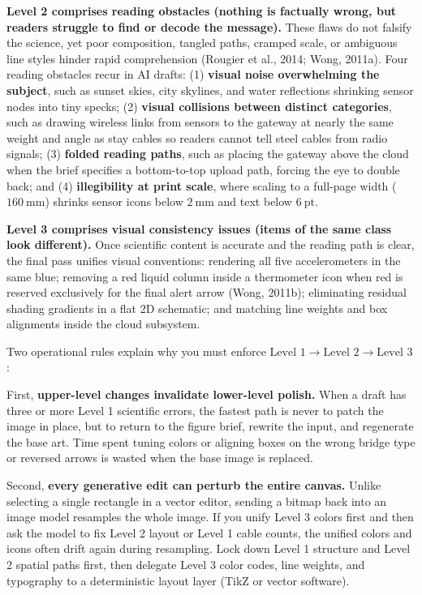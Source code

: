 \textbf{Level 2 comprises reading obstacles (nothing is factually wrong, but readers struggle to find or decode the message).} These flaws do not falsify the science, yet poor composition, tangled paths, cramped scale, or ambiguous line styles hinder rapid comprehension (Rougier et al., 2014; Wong, 2011a). Four reading obstacles recur in AI drafts: (1) \textbf{visual noise overwhelming the subject}, such as sunset skies, city skylines, and water reflections shrinking sensor nodes into tiny specks; (2) \textbf{visual collisions between distinct categories}, such as drawing wireless links from sensors to the gateway at nearly the same weight and angle as stay cables so readers cannot tell steel cables from radio signals; (3) \textbf{folded reading paths}, such as placing the gateway above the cloud when the brief specifies a bottom-to-top upload path, forcing the eye to double back; and (4) \textbf{illegibility at print scale}, where scaling to a full-page width ($160\ \text{mm}$) shrinks sensor icons below $2\ \text{mm}$ and text below $6\ \text{pt}$.

\textbf{Level 3 comprises visual consistency issues (items of the same class look different).} Once scientific content is accurate and the reading path is clear, the final pass unifies visual conventions: rendering all five accelerometers in the same blue; removing a red liquid column inside a thermometer icon when red is reserved exclusively for the final alert arrow (Wong, 2011b); eliminating residual shading gradients in a flat 2D schematic; and matching line weights and box alignments inside the cloud subsystem.

Two operational rules explain why you must enforce $\text{Level 1} \rightarrow \text{Level 2} \rightarrow \text{Level 3}$:

First, \textbf{upper-level changes invalidate lower-level polish.} When a draft has three or more Level 1 scientific errors, the fastest path is never to patch the image in place, but to return to the figure brief, rewrite the input, and regenerate the base art. Time spent tuning colors or aligning boxes on the wrong bridge type or reversed arrows is wasted when the base image is replaced.

Second, \textbf{every generative edit can perturb the entire canvas.} Unlike selecting a single rectangle in a vector editor, sending a bitmap back into an image model resamples the whole image. If you unify Level 3 colors first and then ask the model to fix Level 2 layout or Level 1 cable counts, the unified colors and icons often drift again during resampling. Lock down Level 1 structure and Level 2 spatial paths first, then delegate Level 3 color codes, line weights, and typography to a deterministic layout layer (TikZ or vector software).

